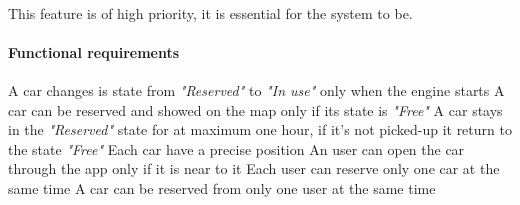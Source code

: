  \ \\
This feature is of high priority, it is essential for the system to be.
\paragraph{Functional requirements }
\begin{itemize}
	 A car changes is state from \emph{"Reserved"} to \emph{"In use"} only when the engine starts
	 A car can be reserved and showed on the map only if its state is \emph{"Free"}
	 A car stays in the \emph{"Reserved"} state for at maximum one hour, if it's not picked-up it return to the state \emph{"Free"}
	 Each car have a precise position
	 An user can open the car through the app only if it is near to it
	 Each user can reserve only one car at the same time
	 A car can be reserved from only one user at the same time
\end{itemize}

